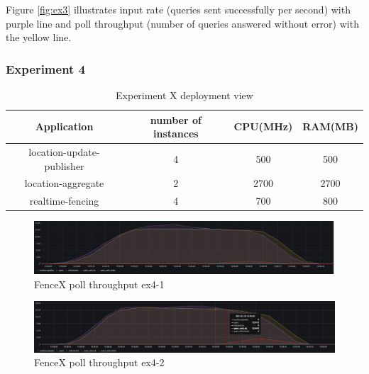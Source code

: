 \documentclass[a4]{report}
\begin{document}
    Figure \ref{fig:ex3} illustrates input rate (queries sent successfully per second) with purple line and poll
    throughput (number of queries answered without error) with the yellow line.

    \clearpage

    \subsubsection{Experiment 4}
    \begin{table}[h!]
        \centering
        \begin{tabular}{|c|c|c|c|}
            \hline
            Application               & number of instances & CPU(MHz) & RAM(MB) \\
            \hline
            location-update-publisher & 4                   & 500      & 500     \\
            location-aggregate        & 2                   & 2700     & 2700    \\
            realtime-fencing          & 4                   & 700      & 800     \\
            \hline
        \end{tabular}
        \caption{Experiment X deployment view}
        \label{table:ex2-dv}
    \end{table}
    
    \begin{figure}[h!]
        \caption{FenceX poll throughput ex4-1}
        \label{fig:ex4-1}
        \includegraphics[scale=0.4]{images/evaluation/ex4-benchmarking(19,10).png}
    \end{figure}

    \begin{figure}[h!]
        \caption{FenceX poll throughput ex4-2}
        \label{fig:ex4-2}
        \includegraphics[scale=0.4]{images/evaluation/ex4-benchmarking(22,10).png}
    \end{figure}
\end{document}
